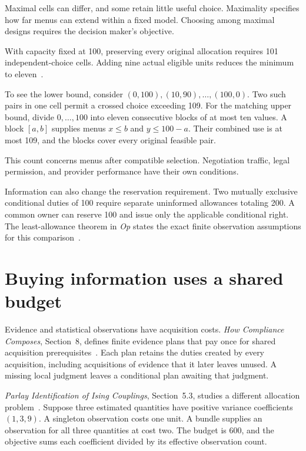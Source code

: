 \documentclass{momentum}
\begin{document}
Maximal cells can differ, and some retain little useful choice. Maximality specifies how far menus can extend within a fixed model.
Choosing among maximal designs requires the decision maker's objective.

With capacity fixed at 100, preserving every original allocation requires 101 independent-choice cells.
Adding nine actual eligible units reduces the minimum to eleven~\cite[Section~5.12.3]{op}.

To see the lower bound, consider $(0,100),(10,90),\ldots,(100,0)$.
Two such pairs in one cell permit a crossed choice exceeding 109.
For the matching upper bound, divide $0,\ldots,100$ into eleven consecutive blocks of at most ten values.
A block $[a,b]$ supplies menus $x\le b$ and $y\le100-a$.
Their combined use is at most 109, and the blocks cover every original feasible pair.

This count concerns menus after compatible selection.
Negotiation traffic, legal permission, and provider performance have their own conditions.

Information can also change the reservation requirement.
Two mutually exclusive conditional duties of 100 require separate uninformed allowances totaling 200.
A common owner can reserve 100 and issue only the applicable conditional right.
The least-allowance theorem in \emph{Op} states the exact finite observation assumptions for this comparison~\cite[Section~5.12]{op}.

\section{Buying information uses a shared budget}
\label{sec:acquisition}

Evidence and statistical observations have acquisition costs.
\emph{How Compliance Composes}, Section~8, defines finite evidence plans that pay once for shared acquisition prerequisites~\cite{compliance}.
Each plan retains the duties created by every acquisition, including acquisitions of evidence that it later leaves unused.
A missing local judgment leaves a conditional plan awaiting that judgment.

\emph{Parlay Identification of Ising Couplings}, Section~5.3, studies a different allocation problem~\cite{parlay}.
Suppose three estimated quantities have positive variance coefficients $(1,3,9)$.
A singleton observation costs one unit.
A bundle supplies an observation for all three quantities at cost two.
The budget is 600, and the objective sums each coefficient divided by its effective observation count.
\end{document}
